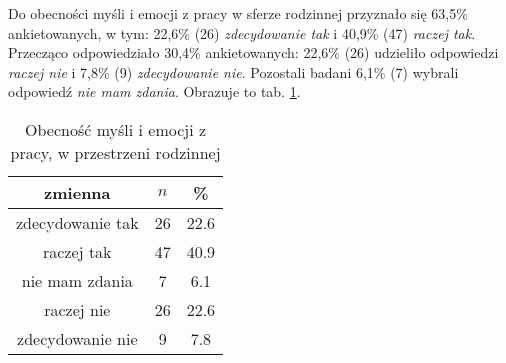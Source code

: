   Do obecności myśli i emocji z pracy w sferze rodzinnej przyznało się 63,5\% ankietowanych, w tym: 22,6\% (26) \textit{zdecydowanie tak} i 40,9\% (47) \textit{raczej tak}. Przecząco odpowiedziało 30,4\% ankietowanych: 22,6\% (26) udzieliło odpowiedzi \textit{raczej nie} i 7,8\% (9) \textit{zdecydowanie nie}. Pozostali badani 6,1\% (7) wybrali odpowiedź \textit{nie mam zdania}. Obrazuje to tab. \ref{tab:Q10}.

\begin{table}[H]
\caption{Obecność myśli i emocji z pracy, w przestrzeni rodzinnej}
\centering
\begin{tabular}{ | c | c | c |}
\hline
zmienna & $n$ & \% \\
\hline
zdecydowanie tak  &  26  & 22.6\\
\hline
raczej tak  &  47  & 40.9 \\
\hline
nie mam zdania  &  7  & 6.1\\
\hline
raczej nie  &  26  & 22.6\\
\hline
zdecydowanie nie  &  9  & 7.8 \\
\hline
\end{tabular}
\label{tab:Q10}
\end{table}

